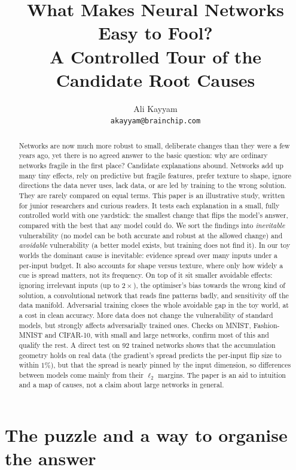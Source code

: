\documentclass[11pt]{article}
\title{What Makes Neural Networks Easy to Fool?\\
A Controlled Tour of the Candidate Root Causes}
\author{Ali Kayyam\\\texttt{akayyam@brainchip.com}}
\date{}
\begin{document}
\sloppy
\maketitle

\begin{abstract}
Networks are now much more robust to small, deliberate changes than they were a few years ago, yet there is no agreed answer to the basic question: why are ordinary networks fragile in the first place? Candidate explanations abound. Networks add up many tiny effects, rely on predictive but fragile features, prefer texture to shape, ignore directions the data never uses, lack data, or are led by training to the wrong solution. They are rarely compared on equal terms.
This paper is an illustrative study, written for junior researchers and curious readers. It tests each explanation in a small, fully controlled world with one yardstick: the smallest change that flips the model's answer, compared with the best that any model could do. We sort the findings into \emph{inevitable} vulnerability (no model can be both accurate and robust at the allowed change) and \emph{avoidable} vulnerability (a better model exists, but training does not find it).
In our toy worlds the dominant cause is inevitable: evidence spread over many inputs under a per-input budget. It also accounts for shape versus texture, where only how widely a cue is spread matters, not its frequency. On top of it sit smaller avoidable effects: ignoring irrelevant inputs (up to $2\times$), the optimiser's bias towards the wrong kind of solution, a convolutional network that reads fine patterns badly, and sensitivity off the data manifold. Adversarial training closes the whole avoidable gap in the toy world, at a cost in clean accuracy. More data does not change the vulnerability of standard models, but strongly affects adversarially trained ones. Checks on MNIST, Fashion-MNIST and CIFAR-10, with small and large networks, confirm most of this and qualify the rest. A direct test on $92$ trained networks shows that the accumulation geometry holds on real data (the gradient's spread predicts the per-input flip size to within $1\%$), but that the spread is nearly pinned by the input dimension, so differences between models come mainly from their $\ell_2$ margins. The paper is an aid to intuition and a map of causes, not a claim about large networks in general.
\end{abstract}

\section{The puzzle and a way to organise the answer}
\end{document}
